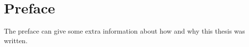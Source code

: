 \chapter*{Preface}
The preface can give some extra information about how and why this thesis was written.